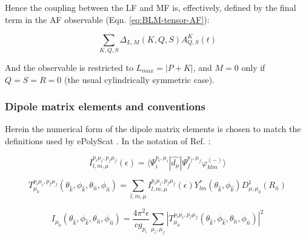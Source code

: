 \documentclass[10pt]{article}
\begin{document}
Hence the coupling between the LF and MF is, effectively, defined by the final term in the AF observable (Eqn. \ref{eq:BLM-tensor-AF}):

\begin{equation}
\sum_{K,Q,S}\Delta_{L,M}(K,Q,S)A_{Q,S}^{K}(t)
\end{equation}

And the observable is restricted to $L_{max}=|P+K|$, and $M=0$ only if  $Q=S=R=0$ (the usual cylindrically symmetric case).

\subsubsection{Dipole matrix elements and conventions\label{sec:mat-ele-conventions}}


Herein the numerical form of the dipole matrix elements is chosen to match the definitions used by ePolyScat \cite{Gianturco1994,Natalense1999,Toffoli2007}. In the notation of Ref. \cite{Toffoli2007}:

\begin{equation}
I_{l,m,\mu}^{p_{i}\mu_{i},p_{f}\mu_{f}}(\epsilon)=\langle\Psi_{i}^{p_{i},\mu_{i}}|\hat{d_{\mu}}|\Psi_{f}^{p_{f},\mu_{f}}\varphi_{klm}^{(-)}\rangle\label{eq:eps-I}
\end{equation}

\begin{equation}
T_{\mu_{0}}^{p_{i}\mu_{i},p_{f}\mu_{f}}(\theta_{\hat{k}},\phi_{\hat{k}},\theta_{\hat{n}},\phi_{\hat{n}})=\sum_{l,m,\mu}I_{l,m,\mu}^{p_{i}\mu_{i},p_{f}\mu_{f}}(\epsilon)Y_{lm}^{*}(\theta_{\hat{k}},\phi_{\hat{k}})D_{\mu,\mu_{0}}^{1}(R_{\hat{n}})\label{eq:eps-TMF}
\end{equation}

\begin{equation}
I_{\mu_{0}}(\theta_{\hat{k}},\phi_{\hat{k}},\theta_{\hat{n}},\phi_{\hat{n}})=\frac{4\pi^{2}\epsilon}{cg_{p_{i}}}\sum_{\mu_{i},\mu_{f}}|T_{\mu_{0}}^{p_{i}\mu_{i},p_{f}\mu_{f}}(\theta_{\hat{k}},\phi_{\hat{k}},\theta_{\hat{n}},\phi_{\hat{n}})|^{2}\label{eq:eps-MFPAD}
\end{equation}
\end{document}
